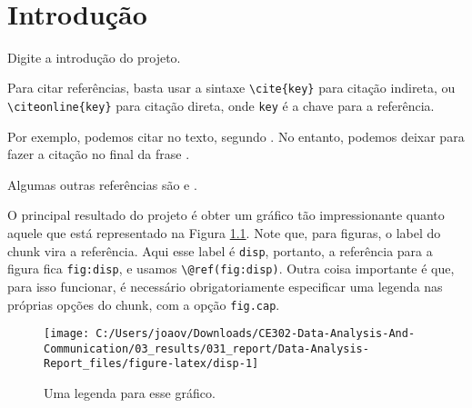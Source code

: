 \documentclass[
	12pt,				%
	openright,			%
	oneside,			%
	a4paper,			%
	brazil				%
	]{abntex2}
\renewcommand{\imprimircapa}{%
  \begin{capa}%
    \center
    \ABNTEXchapterfont\Large \imprimirinstituicao \\
    \vspace*{1cm}
    {\ABNTEXchapterfont\large\imprimirautor}
    \vfill
    \ABNTEXchapterfont\bfseries\LARGE\imprimirtitulo
    \vfill
    \large\imprimirlocal
    \par
    \large\imprimirdata
    \vspace*{1cm}
  \end{capa}
}
\begin{document}
\frenchspacing     %


\imprimircapa

\imprimirfolhaderosto

\tableofcontents*
\cleardoublepage


\textual

\chapter{Introdução}\label{introduuxe7uxe3o}

\bigskip

Digite a introdução do projeto.

Para citar referências, basta usar a sintaxe \texttt{\textbackslash{}cite\{key\}} para citação
indireta, ou \texttt{\textbackslash{}citeonline\{key\}} para citação direta, onde \texttt{key} é a
chave para a referência.

Por exemplo, podemos citar no texto, segundo . No
entanto, podemos deixar para fazer a citação no final da frase
\cite{Casella-Berger2011}.

Algumas outras referências são  e
.

O principal resultado do projeto é obter um gráfico tão impressionante
quanto aquele que está representado na Figura \ref{fig:disp}. Note que,
para figuras, o label do chunk vira a referência. Aqui esse label é
\texttt{disp}, portanto, a referência para a figura fica \texttt{fig:disp}, e usamos
\texttt{\textbackslash{}@ref(fig:disp)}. Outra coisa importante é que, para isso funcionar, é
necessário obrigatoriamente especificar uma legenda nas próprias opções
do chunk, com a opção \texttt{fig.cap}.

\begin{figure}[!h]

{\centering \texttt{[image: C:/Users/joaov/Downloads/CE302-Data-Analysis-And-Communication/03\_results/031\_report/Data-Analysis-Report\_files/figure-latex/disp-1]} 

}

\caption{Uma legenda para esse gráfico.}\label{fig:disp}
\end{figure}
\end{document}
